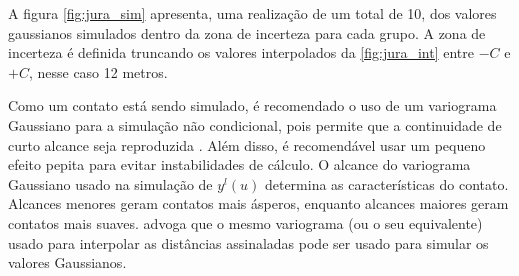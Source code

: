 A figura \autoref{fig:jura_sim} apresenta, uma realização de um total de 10, dos valores gaussianos simulados dentro da zona de incerteza para cada grupo. A zona de incerteza é definida truncando os valores interpolados da \autoref{fig:jura_int} entre $ -C $ e $ + C $, nesse caso 12 metros.

Como um contato está sendo simulado, é recomendado o uso de um variograma Gaussiano para a simulação não condicional, pois permite que a continuidade de curto alcance seja reproduzida \cite{wilde2012kriging}. Além disso, é recomendável usar um pequeno efeito pepita para evitar instabilidades de cálculo. O alcance do variograma Gaussiano usado na simulação de $y^l(u)$ determina as características do contato. Alcances menores geram contatos mais ásperos, enquanto alcances maiores geram contatos mais suaves.  advoga que o mesmo variograma (ou o seu equivalente) usado para interpolar as distâncias assinaladas pode ser usado para simular os valores Gaussianos.

